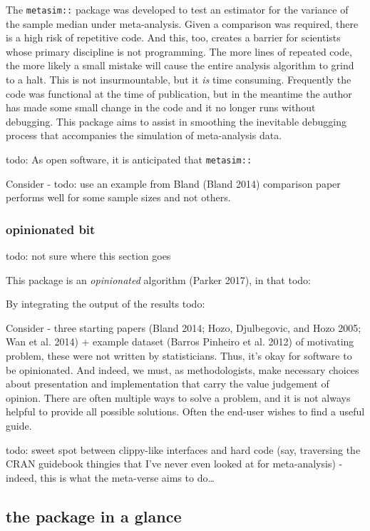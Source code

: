 \documentclass[]{article}
\begin{document}
The \texttt{metasim::} package was developed to test an estimator for
the variance of the sample median under meta-analysis. Given a
comparison was required, there is a high risk of repetitive code. And
this, too, creates a barrier for scientists whose primary discipline is
not programming. The more lines of repeated code, the more likely a
small mistake will cause the entire analysis algorithm to grind to a
halt. This is not insurmountable, but it \emph{is} time consuming.
Frequently the code was functional at the time of publication, but in
the meantime the author has made some small change in the code and it no
longer runs without debugging. This package aims to assist in smoothing
the inevitable debugging process that accompanies the simulation of
meta-analysis data.

todo: As open software, it is anticipated that \texttt{metasim::}

Consider - todo: use an example from Bland (Bland 2014) comparison paper
performs well for some sample sizes and not others.

\hypertarget{opinionated-bit}{%
\subsubsection{opinionated bit}\label{opinionated-bit}}

todo: not sure where this section goes

This package is an \emph{opinionated} algorithm (Parker 2017), in that
todo:

By integrating the output of the results todo:

Consider - three starting papers (Bland 2014; Hozo, Djulbegovic, and
Hozo 2005; Wan et al. 2014) + example dataset (Barros Pinheiro et al.
2012) of motivating problem, these were not written by statisticians.
Thus, it's okay for software to be opinionated. And indeed, we must, as
methodologists, make necessary choices about presentation and
implementation that carry the value judgement of opinion. There are
often multiple ways to solve a problem, and it is not always helpful to
provide all possible solutions. Often the end-user wishes to find a
useful guide.

todo: sweet spot between clippy-like interfaces and hard code (say,
traversing the CRAN guidebook thingies that I've never even looked at
for meta-analysis) - indeed, this is what the meta-verse aims to
do\ldots{}

\hypertarget{the-package-in-a-glance}{%
\subsection{the package in a glance}\label{the-package-in-a-glance}}
\end{document}
